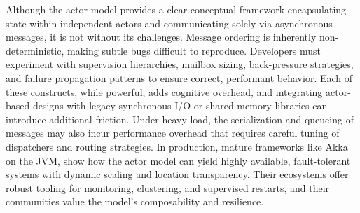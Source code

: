 Although the actor model provides a clear conceptual framework encapsulating state 
within independent actors and communicating solely via asynchronous messages, 
it is not without its challenges. Message ordering is inherently 
non-deterministic, making subtle bugs difficult to reproduce. 
Developers must experiment with supervision hierarchies, 
mailbox sizing, back-pressure strategies, and failure propagation 
patterns to ensure correct, performant behavior. Each of these 
constructs, while powerful, adds cognitive overhead, and integrating 
actor-based designs with legacy synchronous I/O or shared-memory libraries 
can introduce additional friction. Under heavy load, the serialization and 
queueing of messages may also incur performance overhead that requires careful 
tuning of dispatchers and routing strategies. In production, mature frameworks 
like Akka on the JVM, show how the actor model can yield highly available, 
fault-tolerant systems with dynamic scaling and location transparency. Their 
ecosystems offer robust tooling for monitoring, clustering, and supervised 
restarts, and their communities value the model’s composability and resilience. 